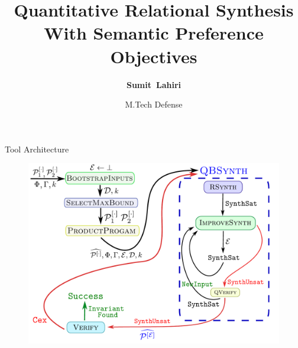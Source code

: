 \documentclass[9pt]{beamer}
\title[M.Tech Defense] %
{Quantitative Relational Synthesis With Semantic Preference Objectives}
\author[Sumit Lahiri] %
{\textbf{Sumit~Lahiri}}
\institute[] %
{
	\large PRAISE Group, CSE Dept. IIT Kanpur
}
\date[02/06/2025] %
{M.Tech Defense}
\begin{document}
\begin{frame}
    \titlepage
\end{frame}







\begin{frame}{Tool Architecture}
    \begin{figure}
        \centering
        \includegraphics[scale=0.45]{assets/tool_arch.pdf}
    \end{figure}
\end{frame}
\end{document}
